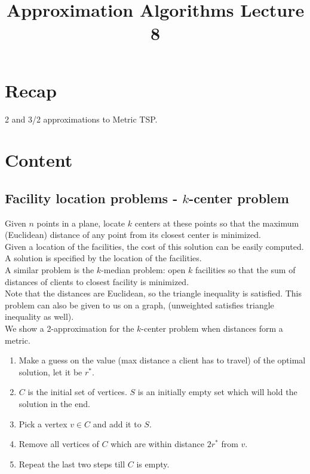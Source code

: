 \documentclass[a4paper]{article}
\title{\textbf{Approximation Algorithms Lecture 8}}
\date{}
\newcommand{\nl}{\vspace{0.2cm}\\}
\begin{document}
\maketitle
\tableofcontents

\section{Recap}

2 and 3/2 approximations to Metric TSP.

\section{Content}

\subsection{Facility location problems - $k$-center problem}

Given $n$ points in a plane, locate $k$ centers at these points so that the maximum (Euclidean) distance of any point from its closest center is minimized.\nl
Given a location of the facilities, the cost of this solution can be easily computed.\nl
A solution is specified by the location of the facilities.\nl

A similar problem is the $k$-median problem: open $k$ facilities so that the sum of distances of clients to closest facility is minimized.\nl

Note that the distances are Euclidean, so the triangle inequality is satisfied. This problem can also be given to us on a graph, (unweighted satisfies triangle inequality as well).\nl
We show a 2-approximation for the $k$-center problem when distances form a metric.
\begin{enumerate}
    \item Make a guess on the value (max distance a client has to travel) of the optimal solution, let it be $r^*$.
    \item $C$ is the initial set of vertices. $S$ is an initially empty set which will hold the solution in the end.
    \item Pick a vertex $v \in C$ and add it to $S$.
    \item Remove all vertices of $C$ which are within distance $2 r^*$ from $v$.
    \item Repeat the last two steps till $C$ is empty.
\end{enumerate}
\end{document}
